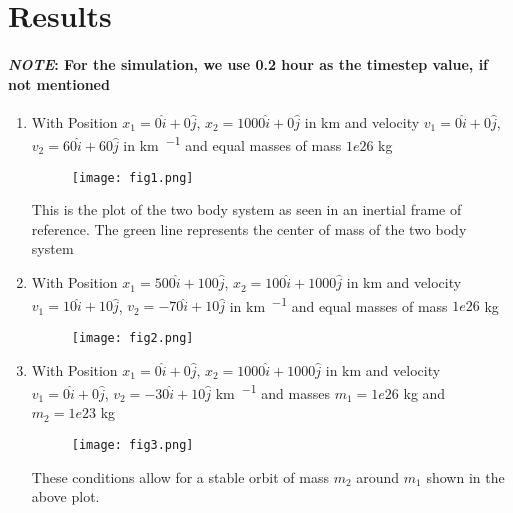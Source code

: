 \newpage
\section{Results}

\paragraph{\textit{NOTE}: For the simulation, we use 0.2 hour as the timestep value, if not mentioned}

\begin{enumerate}

    \item
        With Position $x_1 = 0\hat{i} + 0\hat{j}$, $x_2 = 1000\hat{i} + 0\hat{j}$ in \si{\km} and velocity $v_1 = 0\hat{i} + 0\hat{j}$, $v_2 = 60\hat{i} + 60\hat{j}$ in \si{\km \per \sec} and equal masses of mass $1e26$ kg

        \begin{figure}[h!]
            \centering
            \texttt{[image: fig1.png]}
        \end{figure}

        This is the plot of the two body system as seen in an inertial frame of reference. The green line represents the center of mass of the two body system

        \newpage
    \item
        With Position $x_1 = 500\hat{i} + 100\hat{j}$, $x_2 = 100\hat{i} + 1000\hat{j}$ in km and velocity $v_1 = 10\hat{i} + 10\hat{j}$, $v_2 = -70\hat{i} + 10\hat{j}$ in \si{\km \per \sec} and equal masses of mass $1e26$ kg

        \begin{figure}[h!]
            \texttt{[image: fig2.png]}
            \centering
        \end{figure}

        \newpage
    \item
        With Position $x_1 = 0\hat{i} + 0\hat{j}$, $x_2 = 1000\hat{i} + 1000\hat{j}$ in \si{\km} and velocity $v_1 = 0\hat{i} + 0\hat{j}$, $v_2 = -30\hat{i} + 10\hat{j}$ \si{\km \per \sec} and masses $m_1 = 1e26$ kg and $m_2 = 1e23$ kg

        \begin{figure}[h!]
            \texttt{[image: fig3.png]}
            \centering
        \end{figure}

        These conditions allow for a stable orbit of mass $m_2$ around $m_1$ shown in the above plot.
\end{enumerate}

